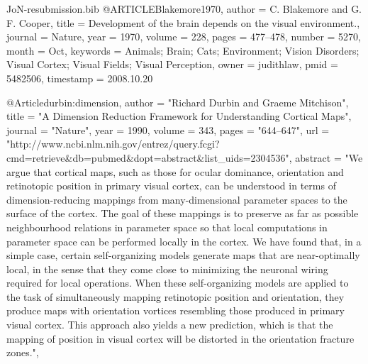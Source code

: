 \documentclass{article}
\begin{document}
\begin{filecontents}{JoN-resubmission.bib}
@ARTICLE{Blakemore1970,
  author = {C. Blakemore and G. F. Cooper},
  title = {Development of the brain depends on the visual environment.},
  journal = {Nature},
  year = {1970},
  volume = {228},
  pages = {477--478},
  number = {5270},
  month = {Oct},
  keywords = {Animals; Brain; Cats; Environment; Vision Disorders; Visual Cortex;
	Visual Fields; Visual Perception},
  owner = {judithlaw},
  pmid = {5482506},
  timestamp = {2008.10.20}
}

@Article{durbin:dimension,
  author       = "Richard Durbin and Graeme Mitchison",
  title	       = "A Dimension Reduction Framework for Understanding
                  Cortical Maps",
  journal      = "Nature",
  year	       = 1990,
  volume       = 343,
  pages	       = "644--647",
  url	       = "http://www.ncbi.nlm.nih.gov/entrez/query.fcgi?cmd=retrieve&db=pubmed&dopt=abstract&list_uids=2304536",
  abstract     = "We argue that cortical maps, such as those for
                  ocular dominance, orientation and retinotopic
                  position in primary visual cortex, can be understood
                  in terms of dimension-reducing mappings from
                  many-dimensional parameter spaces to the surface of
                  the cortex. The goal of these mappings is to
                  preserve as far as possible neighbourhood relations
                  in parameter space so that local computations in
                  parameter space can be performed locally in the
                  cortex. We have found that, in a simple case,
                  certain self-organizing models generate maps that
                  are near-optimally local, in the sense that they
                  come close to minimizing the neuronal wiring
                  required for local operations. When these
                  self-organizing models are applied to the task of
                  simultaneously mapping retinotopic position and
                  orientation, they produce maps with orientation
                  vortices resembling those produced in primary visual
                  cortex. This approach also yields a new prediction,
                  which is that the mapping of position in visual
                  cortex will be distorted in the orientation fracture
                  zones.",
}


\end{filecontents}
\end{document}
